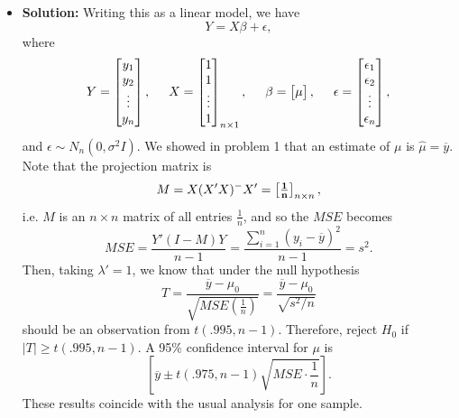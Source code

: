 \documentclass[11pt]{article}
\begin{document}
\begin{itemize}
\item[] {\bf Solution:}  Writing this as a linear model, we have
\[
Y = X\beta + \epsilon,
\]
where
\[
Y = \begin{bmatrix}
y_1 \\ y_2 \\ \vdots \\ y_n
\end{bmatrix}, \hspace{5mm} X = \begin{bmatrix}
1 \\ 1 \\ \vdots \\ 1
\end{bmatrix}_{n\times 1}, \hspace{5mm} \beta = \begin{bmatrix}
\mu
\end{bmatrix}, \hspace{5mm} \epsilon = \begin{bmatrix}
\epsilon_1 \\ \epsilon_2 \\ \vdots \\ \epsilon_n
\end{bmatrix},
\]
and $\epsilon \sim N_{n}(0,\sigma^2I)$.  We showed in problem 1 that an estimate of $\mu$ is $\widehat{\mu} = \overline{y}$.  Note that the projection matrix is
\[
M = X(X'X)^-X' = \begin{bmatrix}
{\bf \frac{1}{n}}
\end{bmatrix}_{n\times n},
\]
i.e. $M$ is an $n\times n$ matrix of all entries $\frac{1}{n}$, and so the $MSE$ becomes
\[
MSE = \frac{Y'(I-M)Y}{n-1} = \frac{\sum_{i=1}^n(y_i-\overline{y})^2}{n-1} = s^2.
\]
Then, taking $\lambda' = 1$, we know that under the null hypothesis
\[
T = \frac{\overline{y} - \mu_0}{\sqrt{MSE(\frac{1}{n})}} = \frac{\overline{y}-\mu_0}{\sqrt{s^2/n}}
\]
should be an observation from $t(.995,n-1)$.
Therefore, reject $H_0$ if $|T| \geq t(.995,n-1)$.  A 95$\%$ confidence interval for $\mu$ is
\[
\left[\overline{y}\pm t(.975,n-1)\sqrt{MSE\cdot\frac{1}{n}} \right].
\]
These results coincide with the usual analysis for one sample.
\end{itemize}

\newpage
\end{document}
